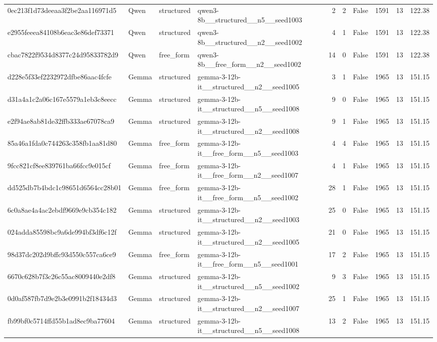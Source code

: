 \begin{longtable}{llllrrrrrr}
0ec213f1d73deeaa3f2be2aa116971d5 & Qwen & structured & qwen3-8b\_\_structured\_\_n5\_\_seed1003 & 2 & 2 & False & 1591 & 13 & 122.38 \\
e2955feeea84108b6eac3e86def73371 & Qwen & structured & qwen3-8b\_\_structured\_\_n2\_\_seed1002 & 4 & 1 & False & 1591 & 13 & 122.38 \\
cbac7822f9534d8377c24d95833782d9 & Qwen & free\_form & qwen3-8b\_\_free\_form\_\_n2\_\_seed1002 & 14 & 0 & False & 1591 & 13 & 122.38 \\
d228e5f33ef2232972dfbe86aac4fcfe & Gemma & structured & gemma-3-12b-it\_\_structured\_\_n2\_\_seed1005 & 3 & 1 & False & 1965 & 13 & 151.15 \\
d31a4a1c2a06c167e5579a1eb3c8eecc & Gemma & structured & gemma-3-12b-it\_\_structured\_\_n5\_\_seed1008 & 9 & 0 & False & 1965 & 13 & 151.15 \\
e2f94ae8ab81de32ffb333ae67078ca9 & Gemma & structured & gemma-3-12b-it\_\_structured\_\_n2\_\_seed1008 & 9 & 1 & False & 1965 & 13 & 151.15 \\
85a46a1fda0c744263c358fb1aa81d80 & Gemma & free\_form & gemma-3-12b-it\_\_free\_form\_\_n5\_\_seed1003 & 4 & 4 & False & 1965 & 13 & 151.15 \\
9fcc821cf8ee839761ba66fcc9e015cf & Gemma & free\_form & gemma-3-12b-it\_\_free\_form\_\_n2\_\_seed1007 & 4 & 1 & False & 1965 & 13 & 151.15 \\
dd525db7b4bdc1c98651d6564cc28b01 & Gemma & free\_form & gemma-3-12b-it\_\_free\_form\_\_n5\_\_seed1002 & 28 & 1 & False & 1965 & 13 & 151.15 \\
6c0a8ae4a4ac2ebdf9669e9cb354c182 & Gemma & structured & gemma-3-12b-it\_\_structured\_\_n2\_\_seed1003 & 25 & 0 & False & 1965 & 13 & 151.15 \\
024adda85598bc9a6de994bf3df6c12f & Gemma & structured & gemma-3-12b-it\_\_structured\_\_n2\_\_seed1005 & 21 & 0 & False & 1965 & 13 & 151.15 \\
98d37dc202d9bffc93d550c557ca6ce9 & Gemma & free\_form & gemma-3-12b-it\_\_free\_form\_\_n5\_\_seed1001 & 17 & 2 & False & 1965 & 13 & 151.15 \\
6670c628b7f3c26c55ac8009440e2df8 & Gemma & structured & gemma-3-12b-it\_\_structured\_\_n5\_\_seed1002 & 9 & 3 & False & 1965 & 13 & 151.15 \\
0d0af587fb7d9e2b3e0991b2f18434d3 & Gemma & structured & gemma-3-12b-it\_\_structured\_\_n2\_\_seed1007 & 25 & 1 & False & 1965 & 13 & 151.15 \\
fb99bf0c5714ffd55b1ad8ec9ba77604 & Gemma & structured & gemma-3-12b-it\_\_structured\_\_n5\_\_seed1008 & 13 & 2 & False & 1965 & 13 & 151.15 \\

\end{longtable}
